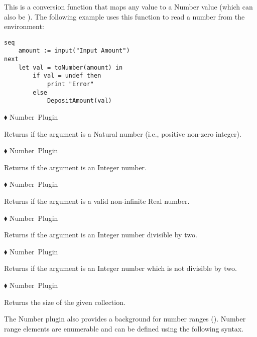 \documentclass{article}
\newcommand{\funcform}[2]{\pform{$\blacklozenge$}{#1}{#2}}
\newcommand{\pform}[3]{\vspace*{4mm} \noindent #1 #2 \vspace{1mm}\textcolor[gray]{0.7}{\dotfill}\mbox{{\sffamily \footnotesize #3}}}
\begin{document}
This is a conversion function that maps any value to a Number value (which can also be ).
The following example uses this function to read a number from the environment:

\begin{lstlisting}
seq
	amount := input("Input Amount")
next
	let val = toNumber(amount) in
		if val = undef then
			print "Error"
		else
			DepositAmount(val)
\end{lstlisting}

\funcform{
}{Number Plugin}

Returns  if the argument is a Natural number (i.e., positive non-zero integer).

\funcform{
}{Number Plugin}

Returns  if the argument is an Integer number.

\funcform{
}{Number Plugin}

Returns  if the argument is a valid non-infinite Real number.

\funcform{
}{Number Plugin}

Returns  if the argument is an Integer number divisible by two.

\funcform{
}{Number Plugin}

Returns  if the argument is an Integer number which is not divisible by two.

\funcform{
}{Number Plugin}

Returns the size of the given collection.

\smallskip
The Number plugin also provides a background for number ranges ().
Number range elements are enumerable and can be defined using the following syntax.
\end{document}
